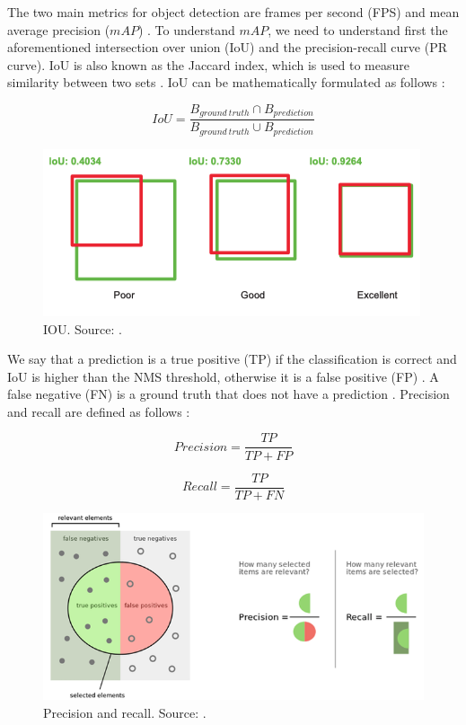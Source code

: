 \documentclass[a4paper, 11pt, oneside]{article}
\begin{document}
The two main metrics for object detection are frames per second (FPS) and mean average precision ($mAP$)
\cite{elgendy2020deep, liu2020deep, geron2019hands, planche2019hands}. To understand $mAP$, we need to understand first
the aforementioned intersection over union (IoU) and the precision-recall curve (PR curve). IoU is also known as
the Jaccard index, which is used to measure similarity between two sets \cite{planche2019hands}. IoU can be
mathematically formulated as follows \cite{elgendy2020deep, planche2019hands}:

$$IoU = \frac{B_{ground \ truth} \cap B_{prediction}}{B_{ground \ truth} \cup B_{prediction}}$$

\begin{figure}[ht]
  \begin{center}
    \includegraphics[width=.6\textwidth]{iou.png}
  \end{center}
  \caption{IOU. Source: \cite{elgendy2020deep}.}
\end{figure}

We say that a prediction is a true positive (TP) if the classification is correct and IoU is higher than the NMS threshold,
otherwise it is a false positive (FP) \cite{elgendy2020deep, liu2020deep, planche2019hands}. A false negative (FN) is a
ground truth that does not have a prediction \cite{planche2019hands}. Precision and recall are defined as follows
\cite{burkov2019hundred, davis2006relationship}:

$$Precision = \frac{TP}{TP + FP}$$

$$Recall = \frac{TP}{TP + FN}$$

\begin{figure}[ht]
  \begin{center}
    \includegraphics[width=\textwidth]{precision_recall.png}
  \end{center}
  \caption{Precision and recall. Source: \cite{precisionrecall}.}
\end{figure}
\end{document}
